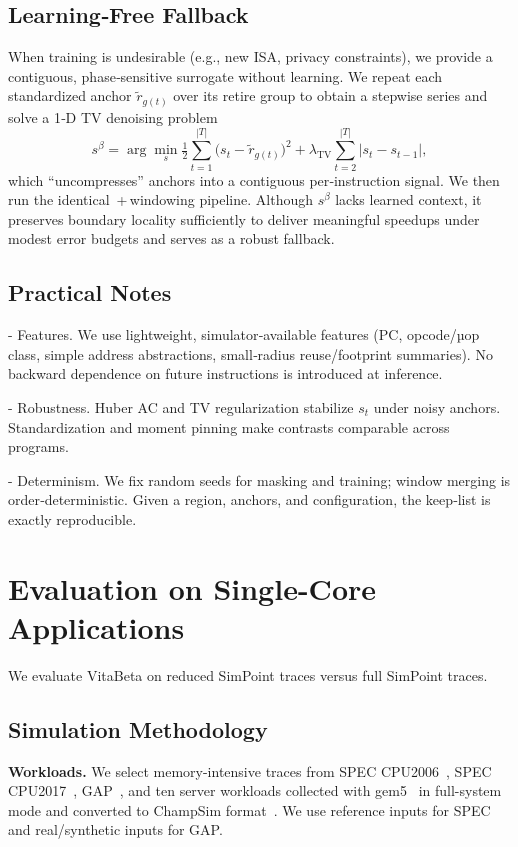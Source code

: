 \subsection{Learning‑Free Fallback}\label{subsec:beta}
When training is undesirable (e.g., new ISA, privacy constraints), we provide a contiguous, phase‑sensitive surrogate without learning. We repeat each standardized anchor \(\tilde{r}_{g(t)}\) over its retire group to obtain a stepwise series and solve a 1‑D TV denoising problem
\[
s^{\beta}=\arg\min_s \tfrac{1}{2}\sum_{t=1}^{|T|}\big(s_t-\tilde{r}_{g(t)}\big)^2+\lambda_{\mathrm{TV}}\!\sum_{t=2}^{|T|}|s_t-s_{t-1}|,
\]
which “uncompresses” anchors into a contiguous per‑instruction signal. We then run the identical \cpd\,+\,windowing pipeline. Although \(s^{\beta}\) lacks learned context, it preserves boundary locality sufficiently to deliver meaningful speedups under modest error budgets and serves as a robust fallback.

\subsection{Practical Notes}
- Features. We use lightweight, simulator‑available features (PC, opcode/µop class, simple address abstractions, small‑radius reuse/footprint summaries). No backward dependence on future instructions is introduced at inference.

- Robustness. Huber AC and TV regularization stabilize \(s_t\) under noisy anchors. Standardization and moment pinning make contrasts comparable across programs.

- Determinism. We fix random seeds for masking and training; window merging is order‑deterministic. Given a region, anchors, and configuration, the keep‑list is exactly reproducible.




\section{Evaluation on Single-Core Applications} 
\label{evaluation_sc}
We evaluate VitaBeta on reduced SimPoint traces versus full SimPoint traces.

\subsection{Simulation Methodology}
\label{subsec:expsetup}
\textbf{Workloads.} We select memory-intensive traces from SPEC CPU2006~\cite{spec2006}, SPEC CPU2017~\cite{spec2017}, GAP~\cite{beamer2017gapbenchmarksuite}, and ten server workloads collected with gem5~\cite{gem52011} in full-system mode and converted to ChampSim format~\cite{llbp_workloads}. We use reference inputs for SPEC and real/synthetic inputs for GAP.

